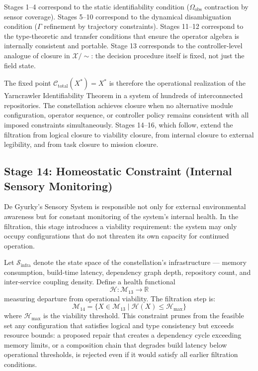 \documentclass[11pt, oneside]{article}
\newcommand{\Xmod}{\mathcal{X}/{\sim}}
\begin{document}
Stages 1--4 correspond to the static identifiability condition ($\Omega_{\mathrm{obs}}$
contraction by sensor coverage). Stages 5--10 correspond to the dynamical disambiguation
condition ($\Gamma$ refinement by trajectory constraints). Stages 11--12 correspond to
the type-theoretic and transfer conditions that ensure the operator algebra is internally
consistent and portable. Stage 13 corresponds to the controller-level analogue of closure
in $\Xmod$: the decision procedure itself is fixed, not just the field state.

The fixed point $\mathcal{C}_{\mathrm{total}}(X^*) = X^*$ is therefore the operational
realization of the Yarncrawler Identifiability Theorem in a system of hundreds of
interconnected repositories. The constellation achieves closure when no alternative module
configuration, operator sequence, or controller policy remains consistent with all imposed
constraints simultaneously. Stages 14--16, which follow, extend the filtration from logical
closure to viability closure, from internal closure to external legibility, and from task
closure to mission closure.

\subsection{Stage 14: Homeostatic Constraint (Internal Sensory Monitoring)}

De Gyurky's Sensory System is responsible not only for external environmental awareness
but for constant monitoring of the system's internal health. In the filtration, this
stage introduces a viability requirement: the system may only occupy configurations that
do not threaten its own capacity for continued operation.

Let $\mathcal{S}_{\mathrm{infra}}$ denote the state space of the constellation's
infrastructure --- memory consumption, build-time latency, dependency graph depth,
repository count, and inter-service coupling density. Define a health functional
\[
\mathcal{H} : \mathcal{M}_{13} \to \mathbb{R}
\]
measuring departure from operational viability. The filtration step is:
\[
\mathcal{M}_{14} = \{ X \in \mathcal{M}_{13} \mid \mathcal{H}(X) \le \mathcal{H}_{\max} \}
\]
where $\mathcal{H}_{\max}$ is the viability threshold. This constraint prunes from the
feasible set any configuration that satisfies logical and type consistency but exceeds
resource bounds: a proposed repair that creates a dependency cycle exceeding memory
limits, or a composition chain that degrades build latency below operational thresholds,
is rejected even if it would satisfy all earlier filtration conditions.
\end{document}
